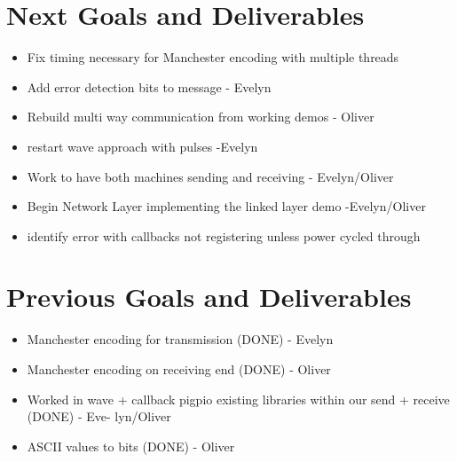 \documentclass{article}
\begin{document}
\section*{Next Goals and Deliverables}
\begin{itemize}
\item Fix timing necessary for Manchester encoding with multiple threads
\item Add error detection bits to message - Evelyn
\item Rebuild multi way communication from working demos - Oliver
\item restart wave approach with pulses -Evelyn
\item Work to have both machines sending and receiving - Evelyn/Oliver
\item Begin Network Layer implementing the linked layer demo -Evelyn/Oliver
\item identify error with callbacks not registering unless power cycled through
\end{itemize}
\section*{Previous Goals and Deliverables}
\begin{itemize}
\item Manchester encoding for transmission (DONE) - Evelyn
\item Manchester encoding on receiving end (DONE) - Oliver
\item Worked in wave + callback pigpio existing libraries within our send + receive (DONE) - Eve- lyn/Oliver
\item ASCII values to bits (DONE) - Oliver
\end{itemize}
\end{document}
